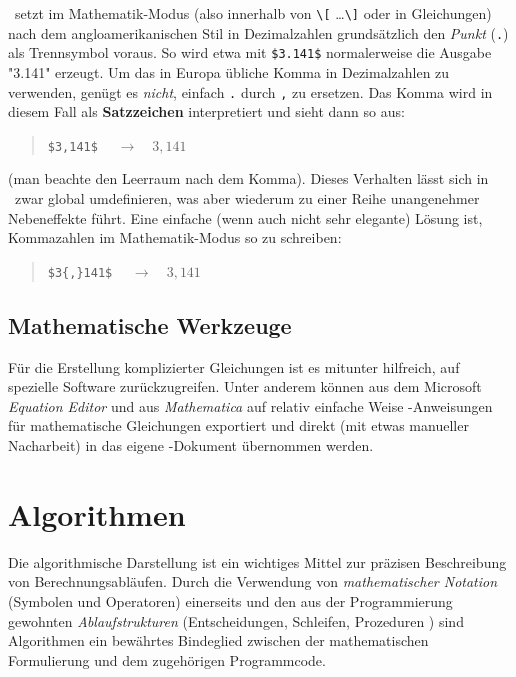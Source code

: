 \latex\ setzt im Mathematik-Modus (also innerhalb von \verb!\[! \ldots \verb!\]! oder in Gleichungen) nach dem angloamerikanischen Stil in Dezimalzahlen grundsätzlich den \emph{Punkt} (\verb!.!) als Trennsymbol voraus. So wird etwa mit \verb!$3.141$! normalerweise die Ausgabe "3.141" erzeugt. Um das in Europa übliche Komma in Dezimalzahlen zu verwenden, genügt es \emph{nicht}, einfach \verb!.! durch \verb!,! zu ersetzen. Das Komma wird in diesem Fall
als \textbf{Satzzeichen} interpretiert und sieht dann so aus:
\begin{quote}
\verb!$3,141$!	$\quad \rightarrow \quad 3,141$ 
\end{quote}
(man beachte den Leerraum nach dem Komma). Dieses Verhalten lässt sich in \latex\ zwar global umdefinieren, was aber wiederum zu einer Reihe unangenehmer Nebeneffekte führt. Eine einfache (wenn auch nicht sehr elegante) Lösung ist, Kommazahlen im Mathematik-Modus so zu schreiben:
\begin{quote}
\verb!$3{,}141$!	$\quad \rightarrow \quad 3{,}141$
\end{quote}



\subsection{Mathematische Werkzeuge}

Für die Erstellung komplizierter Gleichungen ist es mitunter
hilfreich, auf spezielle Software zurückzugreifen. Unter anderem können
aus dem Microsoft \emph{Equation Editor} und aus {\em
Mathematica} auf relativ einfache Weise \latex-An\-wei\-sun\-gen
für mathematische Gleichungen exportiert und direkt (mit etwas
manueller Nacharbeit) in das eigene \latex-Dokument übernommen werden.


\section{Algorithmen}

Die algorithmische Darstellung ist ein wichtiges Mittel zur präzisen Beschreibung von 
Berechnungsabläufen. Durch die Verwendung von \emph{mathematischer Notation} (Symbolen und Operatoren) 
einerseits und den aus der Programmierung gewohnten \emph{Ablaufstrukturen} (Entscheidungen, Schleifen,
Prozeduren \etc) sind Algorithmen ein bewährtes Bindeglied zwischen der mathematischen Formulierung
und dem zugehörigen Programmcode.

